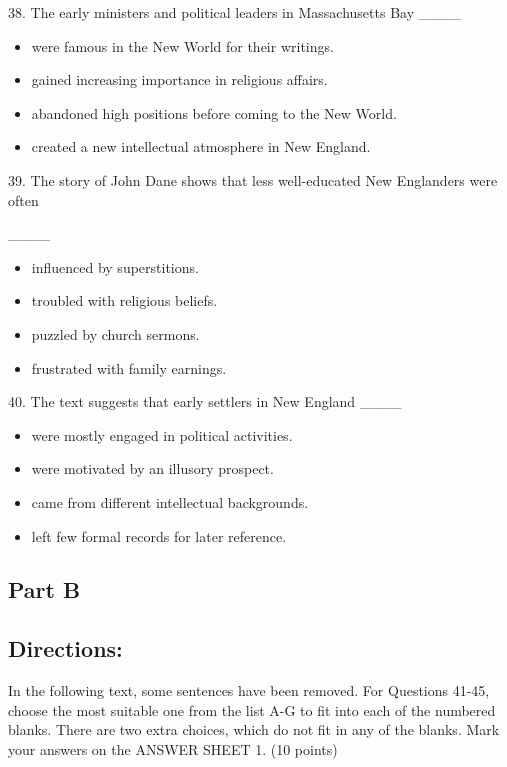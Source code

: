 \documentclass[UTF8,11pt]{ctexart}
\begin{document}
38. The early ministers and political leaders in Massachusetts Bay \_\_\_\_


\begin{itemize}[leftmargin=2em,itemsep=.2em,topsep=.4em]\item[A.] were famous in the New World for their writings.
\item[B.] gained increasing importance in religious affairs.
\item[C.] abandoned high positions before coming to the New World.
\item[D.] created a new intellectual atmosphere in New England.
\end{itemize}

39. The story of John Dane shows that less well-educated New Englanders were often


\_\_\_\_


\begin{itemize}[leftmargin=2em,itemsep=.2em,topsep=.4em]\item[A.] influenced by superstitions.
\item[B.] troubled with religious beliefs.
\item[C.] puzzled by church sermons.
\item[D.] frustrated with family earnings.
\end{itemize}

40. The text suggests that early settlers in New England \_\_\_\_


\begin{itemize}[leftmargin=2em,itemsep=.2em,topsep=.4em]\item[A.] were mostly engaged in political activities.
\item[B.] were motivated by an illusory prospect.
\item[C.] came from different intellectual backgrounds.
\item[D.] left few formal records for later reference.
\end{itemize}

\subsection*{\textbf{Part B}}


\subsection*{\textbf{Directions:}}


In the following text, some sentences have been removed. For Questions 41-45, choose the most suitable one from the list A-G to fit into each of the numbered blanks. There are two extra choices, which do not fit in any of the blanks. Mark your answers on the ANSWER SHEET 1. (10 points)
\end{document}
